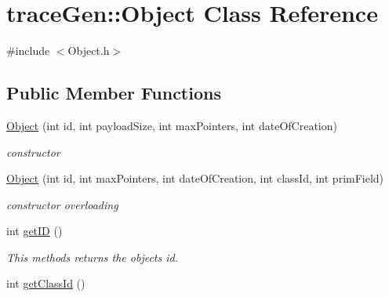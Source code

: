 \hypertarget{classtrace_gen_1_1_object}{}\section{trace\+Gen\+:\+:Object Class Reference}
\label{classtrace_gen_1_1_object}


{\ttfamily \#include $<$Object.\+h$>$}

\subsection*{Public Member Functions}
\begin{DoxyCompactItemize}
\item 
\hypertarget{classtrace_gen_1_1_object_a5a8a997fcd8aa53fd0f3c39e8976638a}{}\hyperlink{classtrace_gen_1_1_object_a5a8a997fcd8aa53fd0f3c39e8976638a}{Object} (int id, int payload\+Size, int max\+Pointers, int date\+Of\+Creation)\label{classtrace_gen_1_1_object_a5a8a997fcd8aa53fd0f3c39e8976638a}

\begin{DoxyCompactList}\small\item\em constructor \end{DoxyCompactList}\item 
\hypertarget{classtrace_gen_1_1_object_af77c14f7fcd45e691fff22bc3b549220}{}\hyperlink{classtrace_gen_1_1_object_af77c14f7fcd45e691fff22bc3b549220}{Object} (int id, int max\+Pointers, int date\+Of\+Creation, int class\+Id, int prim\+Field)\label{classtrace_gen_1_1_object_af77c14f7fcd45e691fff22bc3b549220}

\begin{DoxyCompactList}\small\item\em constructor overloading \end{DoxyCompactList}\item 
\hypertarget{classtrace_gen_1_1_object_a99a8389a22915067650a7f5fb9167c03}{}int \hyperlink{classtrace_gen_1_1_object_a99a8389a22915067650a7f5fb9167c03}{get\+I\+D} ()\label{classtrace_gen_1_1_object_a99a8389a22915067650a7f5fb9167c03}

\begin{DoxyCompactList}\small\item\em This methods returns the object\textquotesingle{}s id. \end{DoxyCompactList}\item 
\hypertarget{classtrace_gen_1_1_object_a87e49f9f545bf6c8f0244c5f3e7ed40d}{}int \hyperlink{classtrace_gen_1_1_object_a87e49f9f545bf6c8f0244c5f3e7ed40d}{get\+Class\+Id} ()\label{classtrace_gen_1_1_object_a87e49f9f545bf6c8f0244c5f3e7ed40d}


\end{DoxyCompactItemize}
